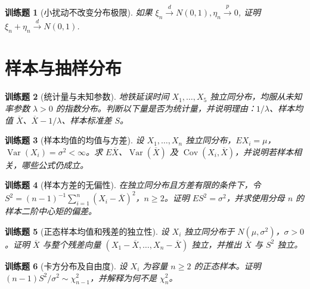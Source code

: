 \documentclass[UTF8,12pt,a4paper,fontset=fandol]{ctexbook}
\newtheorem{exercise}{训练题}[section]
\begin{document}
\begin{exercise}[小扰动不改变分布极限]\label{q:A7.25}
如果 $\xi_n\xrightarrow{d}N(0,1),\eta_n\xrightarrow{p}0$, 证明 $\xi_n+\eta_n\xrightarrow{d}N(0,1)$.\par{}\end{exercise}

\clearpage\section{样本与抽样分布}

\begin{exercise}[统计量与未知参数]\label{q:M-F-C4}
地铁延误时间 $X_1,\ldots,X_5$ 独立同分布，均服从未知率参数 $\lambda>0$ 的指数分布。判断以下量是否为统计量，并说明理由：$1/\lambda$、样本均值 $\overline X$、$\overline X-1/\lambda$、样本标准差 $S$。\par{}\end{exercise}

\begin{exercise}[样本均值的均值与方差]\label{q:B8.1}
设 $X_1,\ldots,X_n$ 独立同分布，$EX_i=\mu$，$\operatorname{Var}(X_i)=\sigma^2<\infty$。求 $E\overline X$、$\operatorname{Var}(\overline X)$ 及 $\operatorname{Cov}(X_i,\overline X)$，并说明若样本相关，哪些公式仍成立。\par{}\end{exercise}

\begin{exercise}[样本方差的无偏性]\label{q:B8.2}
在独立同分布且方差有限的条件下，令 $S^2=(n-1)^{-1}\sum_{i=1}^n(X_i-\overline X)^2$，$n\ge2$。证明 $ES^2=\sigma^2$，并求使用分母 $n$ 的样本二阶中心矩的偏差。\par{}\end{exercise}

\begin{exercise}[正态样本均值和残差的独立性]\label{q:B8.3}
设 $X_i$ 独立同分布于 $N(\mu,\sigma^2)$，$\sigma>0$。证明 $\overline X$ 与整个残差向量 $(X_1-\overline X,\ldots,X_n-\overline X)$ 独立，并推出 $\overline X$ 与 $S^2$ 独立。\par{}\end{exercise}

\begin{exercise}[卡方分布及自由度]\label{q:B8.4}
设 $X_i$ 为容量 $n\ge2$ 的正态样本。证明 $(n-1)S^2/\sigma^2\sim\chi^2_{n-1}$，并解释为何不是 $\chi^2_n$。\par{}\end{exercise}
\end{document}
